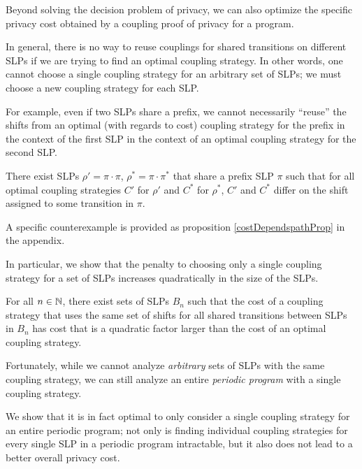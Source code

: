 
Beyond solving the decision problem of privacy, we can also optimize the specific privacy cost obtained by a coupling proof of privacy for a program. 

In general, there is no way to reuse couplings for shared transitions on different SLPs if we are trying to find an optimal coupling strategy. In other words, one cannot choose a single coupling strategy for an arbitrary set of SLPs; we must choose a new coupling strategy for each SLP.

For example, even if two SLPs share a prefix, we cannot necessarily ``reuse'' the shifts from an optimal (with regards to cost) coupling strategy for the prefix in the context of the first SLP in the context of an optimal coupling strategy for the second SLP. 

\begin{prop}\label{noSharingStrategiesProp}
  There exist SLPs $\rho'=\pi\cdot \pi$, $\rho^*=\pi\cdot\pi^*$ that share a prefix SLP $\pi$ such that for all optimal coupling strategies $C'$ for $\rho'$ and $C^*$ for $\rho^*$, $C'$ and $C^*$ differ on the shift assigned to some transition in $\pi$. 
\end{prop}

A specific counterexample is provided as proposition \ref{costDependspathProp} in the appendix. 

In particular, we show that the penalty to choosing only a single coupling strategy for a set of SLPs increases quadratically in the size of the SLPs.

\begin{prop}\label{quadraticPenaltyProp}
  For all $n\in \mathbb{N}$, there exist sets of SLPs $B_n$ such that the cost of a coupling strategy that uses the same set of shifts for all shared transitions between SLPs in $B_n$ has cost that is a quadratic factor larger than the cost of an optimal coupling strategy. 
\end{prop}

Fortunately, while we cannot analyze \textit{arbitrary} sets of SLPs with the same coupling strategy, we can still analyze an entire \textit{periodic program} with a single coupling strategy.

We show that it is in fact optimal to only consider a single coupling strategy for an entire periodic program; not only is finding individual coupling strategies for every single SLP in a periodic program intractable, but it also does not lead to a better overall privacy cost. 


